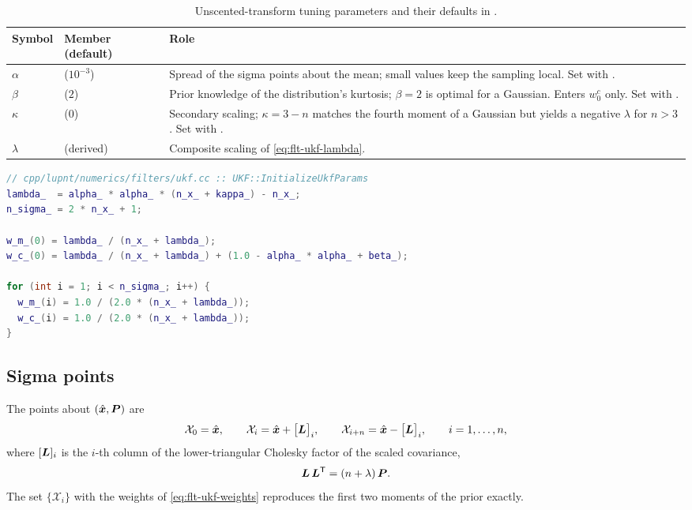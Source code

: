 \begin{table}[H]
  \centering
  \caption{Unscented-transform tuning parameters and their defaults in
           .}
  \label{tab:flt-ukf-params}
  \begin{tabularx}{\textwidth}{llL}
    \toprule
    Symbol & Member (default) & Role \\
    \midrule
    $\alpha$ &  ($10^{-3}$) &
      Spread of the sigma points about the mean; small values keep the sampling
      local. Set with . \\
    $\beta$ &  ($2$) &
      Prior knowledge of the distribution's kurtosis; $\beta = 2$ is optimal
      for a Gaussian. Enters $w^c_0$ only. Set with . \\
    $\kappa$ &  ($0$) &
      Secondary scaling; $\kappa = 3 - n$ matches the fourth moment of a
      Gaussian but yields a negative $\lambda$ for $n > 3$. Set with
      . \\
    $\lambda$ &  (derived) &
      Composite scaling of \cref{eq:flt-ukf-lambda}. \\
    \bottomrule
  \end{tabularx}
\end{table}

\begin{lstlisting}[language=cpp, caption={Unscented-transform weights.},
                   label={lst:flt-ukf-weights}]
// cpp/lupnt/numerics/filters/ukf.cc :: UKF::InitializeUkfParams
lambda_  = alpha_ * alpha_ * (n_x_ + kappa_) - n_x_;
n_sigma_ = 2 * n_x_ + 1;

w_m_(0) = lambda_ / (n_x_ + lambda_);
w_c_(0) = lambda_ / (n_x_ + lambda_) + (1.0 - alpha_ * alpha_ + beta_);

for (int i = 1; i < n_sigma_; i++) {
  w_m_(i) = 1.0 / (2.0 * (n_x_ + lambda_));
  w_c_(i) = 1.0 / (2.0 * (n_x_ + lambda_));
}
\end{lstlisting}

\subsection{Sigma points}

The points about $(\hat{\bm{x}}, \bm{P})$ are
\begin{equation}
  \label{eq:flt-ukf-sigma}
  \mathcal{X}_0 = \hat{\bm{x}},
  \qquad
  \mathcal{X}_i = \hat{\bm{x}} + \bigl[\bm{L}\bigr]_i,
  \qquad
  \mathcal{X}_{i+n} = \hat{\bm{x}} - \bigl[\bm{L}\bigr]_i,
  \qquad i = 1,\dots,n ,
\end{equation}
where $[\bm{L}]_i$ is the $i$-th column of the lower-triangular Cholesky
factor of the scaled covariance,
\begin{equation}
  \label{eq:flt-ukf-chol}
  \bm{L}\,\bm{L}^{\mathsf{T}} = (n + \lambda)\,\bm{P} .
\end{equation}
The set $\{\mathcal{X}_i\}$ with the weights of \cref{eq:flt-ukf-weights}
reproduces the first two moments of the prior exactly.

